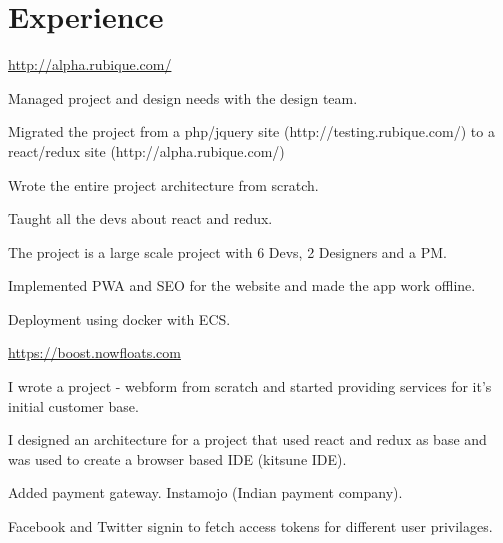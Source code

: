 \documentclass[]{deedy-resume-openfont}
\begin{document}
\hfill
\begin{minipage}[t]{0.66\textwidth}


\section{Experience}


{ \url{ http://alpha.rubique.com/ } }\\
\vspace{\topsep} %
\begin{tightemize}
\item Managed project and design needs with the design team.
\item Migrated the project from a php/jquery site (http://testing.rubique.com/) to a react/redux site (http://alpha.rubique.com/)
\item Wrote the entire project architecture from scratch.
\item Taught all the devs about react and redux.
\item The project is a large scale project with 6 Devs, 2 Designers and a PM.
\item Implemented PWA and SEO for the website and made the app work offline.
\item Deployment using docker with ECS.
\end{tightemize}
\sectionsep


{ \url{ https://boost.nowfloats.com } }\\
\begin{tightemize}
\item I wrote a project - webform from scratch and started providing services for it's initial customer base.
\item I designed an architecture for a project that used react and redux as base and was used to create a browser based IDE (kitsune IDE).
\item Added payment gateway. Instamojo (Indian payment company).
\item Facebook and Twitter signin to fetch access tokens for different user privilages.
\vspace{\topsep} %
\end{tightemize}


\end{minipage}
\end{document}
